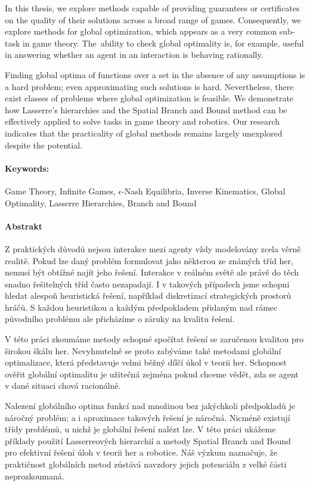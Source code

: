 {{In this thesis, we explore methods capable of providing guarantees or certificates on the quality of their solutions across a broad range of games. Consequently, we explore methods for global optimization, which appears as a very common sub-task in game theory. The~ability to check global optimality is, for example, useful in answering whether an agent in an interaction is behaving rationally.

Finding global optima of functions over a set in the absence of any assumptions is a hard problem; even approximating such solutions is hard. Nevertheless, there exist classes of problems where global optimization is feasible. We demonstrate how Lasserre's hierarchies and the Spatial Branch and Bound method can be effectively applied to solve tasks in game theory and robotics. Our research indicates that the practicality of global methods remains largely unexplored despite the potential.

\paragraph{Keywords:} Game Theory, Infinite Games, $\epsilon$-Nash Equilibria, Inverse Kinematics, Global Optimality, Lasserre Hierarchies, Branch and Bound

\paragraph{Abstrakt}
Z praktických důvodů nejsou interakce mezi agenty vždy modelovány zcela věrně realitě. Pokud lze daný problém formulovat jako některou ze známých tříd her, nemusí být obtížné najít jeho řešení. Interakce v reálném světě ale právě do těch snadno řešitelných tříd často nezapadají. I v takových případech jsme schopni hledat alespoň heuristická řešení, například diskretizací strategických prostorů hráčů. S každou heuristikou a každým předpokladem přidaným nad rámec původního problému ale přicházíme o záruky na kvalitu řešení.

V této práci zkoumáme metody schopné spočítat řešení se zaručenou kvalitou pro širokou škálu her. Nevyhnutelně se proto zabýváme také metodami globální optimalizace, která představuje velmi běžný dílčí úkol v teorii her. Schopnost ověřit globální optimalitu je užitečná zejména pokud chceme vědět, zda se agent v dané situaci chová racionálně.

Nalezení globálního optima funkcí nad množinou bez jakýchkoli předpokladů je náročný problém; a i aproximace takových řešení je náročná. Nicméně existují třídy problémů, u nichž je globální řešení nalézt lze. V této práci ukážeme příklady použití Lasserreových hierarchií a metody Spatial Branch and Bound pro efektivní řešení úloh v teorii her a robotice. Náš výzkum naznačuje, že praktičnost globálních metod zůstává navzdory jejich potenciálu z velké části neprozkoumaná.

}}
